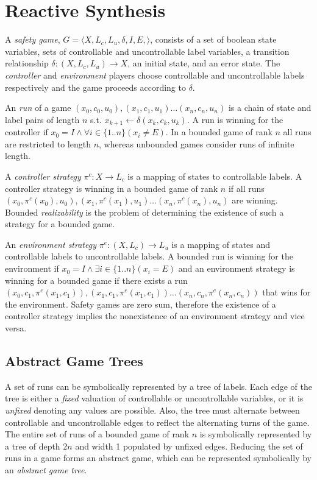 \documentclass{llncs}
\begin{document}
\section{Reactive Synthesis}

A \emph{safety game}, $G = \langle X, L_c, L_u, \delta, I, E, \rangle$,
consists of a set of boolean state variables, sets of controllable and
uncontrollable label variables, a transition relationship $\delta : (X, L_c,
L_u) \to X$, an initial state, and an error state. The \emph{controller} and
\emph{environment} players choose controllable and uncontrollable labels
respectively and the game proceeds according to $\delta$. 

An \emph{run} of a game $(x_0, c_0, u_0), (x_1, c_1, u_1) \dots (x_n, c_n,
u_n)$ is a chain of state and label pairs of length $n$ s.t.  $x_{k+1}
\leftarrow \delta(x_k, c_k, u_k)$. A run is winning for the controller if $x_0
= I \land \forall i \in \{1..n\} (x_i \neq E)$. In a bounded game of rank $n$
all runs are restricted to length $n$, whereas unbounded games consider runs of
infinite length.

A \emph{controller strategy} $\pi^c : X \to L_c$ is a mapping of states to
controllable labels. A controller strategy is winning in a bounded game of rank
$n$ if all runs $(x_0, \pi^c(x_0), u_0), (x_1, \pi^c(x_1), u_1) \dots (x_n,
\pi^c(x_n), u_n)$ are winning. Bounded \emph{realizability} is the problem of
determining the existence of such a strategy for a bounded game.

An \emph{environment strategy} $\pi^e : (X, L_c) \to L_u$ is a mapping of
states and controllable labels to uncontrollable labels. A bounded run is
winning for the environment if $x_0 = I \land \exists i \in \{1..n\} (x_i = E)$
and an environment strategy is winning for a bounded game if there exists a run
$(x_0, c_1, \pi^e(x_1, c_1)), (x_1, c_1, \pi^e(x_1, c_1)) \dots (x_n, c_n,
\pi^e(x_n, c_n))$ that wins for the environment. Safety games are zero sum,
therefore the existence of a controller strategy implies the nonexistence of an
environment strategy and vice versa.

\subsection{Abstract Game Trees}

A set of runs can be symbolically represented by a tree of labels. Each edge of
the tree is either a \emph{fixed} valuation of controllable or uncontrollable
variables, or it is \emph{unfixed} denoting any values are possible. Also, the
tree must alternate between controllable and uncontrollable edges to reflect
the alternating turns of the game. The entire set of runs of a bounded game of
rank $n$ is symbolically represented by a tree of depth $2n$ and width 1
populated by unfixed edges. Reducing the set of runs in a game forms an
abstract game, which can be represented symbolically by an \emph{abstract game
tree}.
\end{document}
